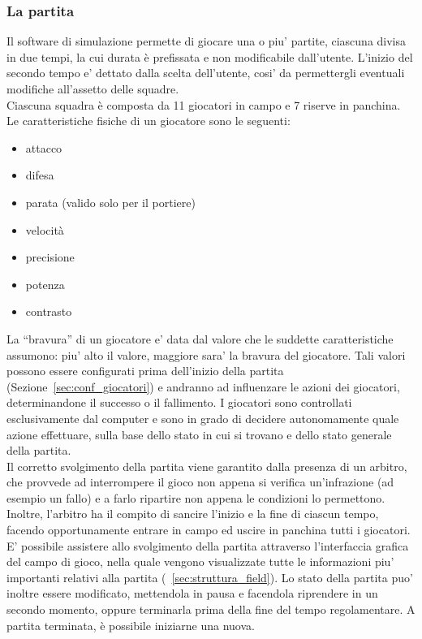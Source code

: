 \subsubsection{La partita}
\label{sec:partita}

Il software di simulazione permette di giocare una o piu' partite, ciascuna divisa in due tempi, la cui durata \`{e} prefissata e non modificabile dall'utente. L'inizio del secondo tempo e' dettato dalla scelta dell'utente, cosi' da permettergli eventuali modifiche all'assetto delle squadre.\\

Ciascuna squadra \`{e} composta da 11 giocatori in campo e 7 riserve in panchina. Le caratteristiche fisiche di un giocatore sono le seguenti:
\begin{itemize}
	\item attacco
	\item difesa
	\item parata (valido solo per il portiere)
	\item velocit\`{a}
	\item precisione
	\item potenza
	\item contrasto
\end{itemize}

La ``bravura'' di un giocatore e' data dal valore che le suddette caratteristiche assumono: piu' alto il valore, maggiore sara' la bravura del giocatore. Tali valori possono essere configurati prima dell'inizio della partita (Sezione~\ref{sec:conf_giocatori}) e andranno ad influenzare le azioni dei giocatori, determinandone il successo o il fallimento. I giocatori sono controllati esclusivamente dal computer e sono in grado di decidere autonomamente quale azione effettuare, sulla base dello stato in cui si trovano e dello stato generale della partita.\\

Il corretto svolgimento della partita viene garantito dalla presenza di un arbitro, che provvede ad interrompere il gioco non appena si verifica un'infrazione (ad esempio un fallo) e a farlo ripartire non appena le condizioni lo permettono. Inoltre, l'arbitro ha il compito di sancire l'inizio e la fine di ciascun tempo, facendo opportunamente entrare in campo ed uscire in panchina tutti i giocatori.\\

E' possibile assistere allo svolgimento della partita attraverso l'interfaccia grafica del campo di gioco, nella quale vengono visualizzate tutte le informazioni piu' importanti relativi alla partita (~\ref{sec:struttura_field}). Lo stato della partita puo' inoltre essere modificato, mettendola in pausa e facendola riprendere in un secondo momento, oppure terminarla prima della fine del tempo regolamentare. A partita terminata, \`{e} possibile iniziarne una nuova.


